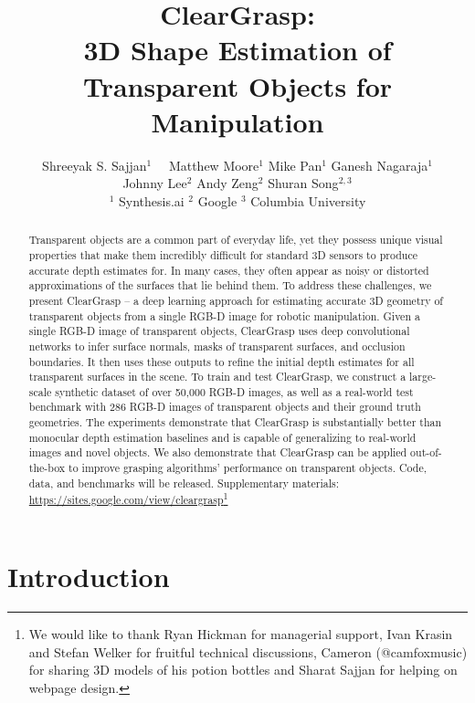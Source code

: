 \documentclass[letterpaper, 10 pt, conference]{ieeeconf}
\title{\LARGE \bf ClearGrasp: \\3D Shape Estimation of Transparent Objects for Manipulation \vspace{-3mm}}
\author{Shreeyak S. Sajjan$^{1}$  \quad　Matthew Moore$^{1}$  \quad Mike Pan$^{1}$  \quad Ganesh Nagaraja$^{1}$  \\ Johnny Lee$^{2}$ \quad  Andy Zeng$^{2}$  \quad  Shuran Song$^{2,3}$
\vspace{0.1cm} \\ 
$^{1}$ Synthesis.ai \quad\quad
$^{2}$ Google \quad\quad
$^{3}$ Columbia University \quad\quad
}
\begin{document}
\maketitle
\thispagestyle{empty}
\pagestyle{empty}


\begin{abstract}
Transparent objects are a common part of everyday life, yet they possess unique visual properties that make them incredibly difficult for standard 3D sensors to produce accurate depth estimates for. In many cases, they often appear as noisy or distorted approximations of the surfaces that lie behind them. To address these challenges, we present ClearGrasp -- a deep learning approach for estimating accurate 3D geometry of transparent objects from a single RGB-D image for robotic manipulation. Given a single RGB-D image of transparent objects, ClearGrasp uses deep convolutional networks to infer surface normals, masks of transparent surfaces, and occlusion boundaries. It then uses these outputs to refine the initial depth estimates for all transparent surfaces in the scene. To train and test ClearGrasp, we construct a large-scale synthetic dataset of over 50,000 RGB-D images, as well as a real-world test benchmark with 286 RGB-D images of transparent objects and their ground truth geometries. The experiments demonstrate that ClearGrasp is substantially better than monocular depth estimation baselines and is capable of generalizing to real-world images and novel objects. We also demonstrate that ClearGrasp can be applied out-of-the-box to improve grasping algorithms' performance on transparent objects. Code, data, and benchmarks will be released. Supplementary materials: \href{https://sites.google.com/view/cleargrasp}{https://sites.google.com/view/cleargrasp}\footnote{We would like to thank Ryan Hickman for managerial support, Ivan Krasin and Stefan Welker for fruitful technical discussions, Cameron (@camfoxmusic) for sharing 3D models of his potion bottles and Sharat Sajjan for helping on webpage design.
}

\end{abstract}




\section{Introduction}
\end{document}
